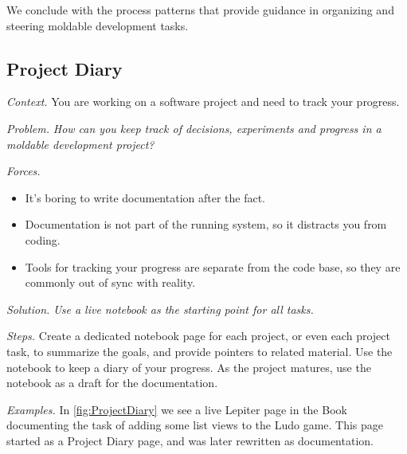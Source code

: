 \documentclass[sigconf,screen]{acmart}
\newcommand\eog[1]{\nbc{Edward}{#1}{purple}}
\newcommand\cp[1]{\nbe{Cesare}{#1}{olive}} %
\newcommand{\GT}{\lst{GT}\xspace} %
\newcommand{\pattern}[2]{\needlines{10}
\subsection*{#1}\label{pat:#2}}
\newcommand{\patsec}[1]{\noindent\textit{#1.}\xspace}
\begin{document}
We conclude with the process patterns that provide guidance in organizing and steering moldable development tasks.

\pattern{Project Diary}{ProjectDiary}

\patsec{Context}
You are working on a software project and need to track your progress.

\patsec{Problem}
\emph{How can you keep track of decisions, experiments and progress in a moldable development project?}

\patsec{Forces}
\begin{itemize}[---]
\item It's boring to write documentation after the fact.
\item Documentation is not part of the running system, so it distracts you from coding.
\item Tools for tracking your progress are separate from the code base, so they are commonly out of sync with reality.
\end{itemize}

\patsec{Solution}
\emph{Use a live notebook 
as the starting point for all tasks.}

\patsec{Steps}
Create a dedicated notebook page for each project, or even each project task, to summarize the goals, and provide pointers to related material.
Use the notebook to keep a diary of your progress.
As the project matures, use the notebook as a draft 
for the documentation.

\patsec{Examples}
In \autoref{fig:ProjectDiary} we see a live Lepiter page in the \GT Book
documenting the task of adding some list views to the Ludo game.
This page started as a Project Diary page, and was later rewritten as documentation.

\end{document}

